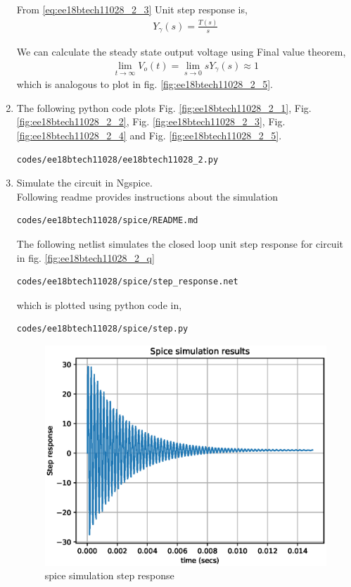 \begin{enumerate}[label=\arabic*.,ref=\theenumi]
From \eqref{eq:ee18btech11028_2_3} Unit step response is,
\begin{align}
    Y_{\gamma}(s) = \frac{T(s)}{s}
\end{align}

We can calculate the steady state output voltage using Final value theorem,
\begin{align}
    \lim_{t\to\infty} V_{o}(t) = \lim_{s \to 0} sY_{\gamma}(s) \approx 1
\end{align}
which is analogous to plot in fig. \ref{fig:ee18btech11028_2_5}.
\item The following python code plots  Fig. \ref{fig:ee18btech11028_2_1}, Fig. \ref{fig:ee18btech11028_2_2}, Fig. \ref{fig:ee18btech11028_2_3}, Fig. \ref{fig:ee18btech11028_2_4} and Fig. \ref{fig:ee18btech11028_2_5}.
\begin{lstlisting}
codes/ee18btech11028/ee18btech11028_2.py
\end{lstlisting}
\item Simulate the circuit in Ngspice.
\\
\solution Following readme provides instructions about the simulation

\begin{lstlisting}
codes/ee18btech11028/spice/README.md
\end{lstlisting}

The following netlist simulates the closed loop unit step response for circuit in fig. \ref{fig:ee18btech11028_2_q}
\begin{lstlisting}
codes/ee18btech11028/spice/step_response.net
\end{lstlisting}
which is plotted using python code in,
\begin{lstlisting}
codes/ee18btech11028/spice/step.py
\end{lstlisting}
\begin{figure}[!ht]
    \centering
    \includegraphics[width=\columnwidth]{./figs/ee18btech11028/spice_step_response.eps}
    \caption{spice simulation step response}
    \label{fig:ee18btech11028_2_6}
\end{figure}


\end{enumerate}
